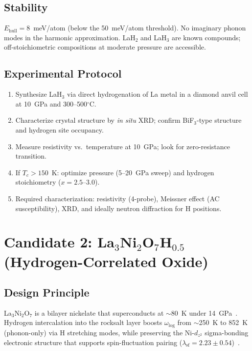 \documentclass[aps,prb,reprint,superscriptaddress,longbibliography]{revtex4-2}
\begin{document}
\subsection{Stability}

$E_{\mathrm{hull}} = 8$~meV/atom (below the 50~meV/atom threshold). No imaginary phonon modes in the harmonic approximation. LaH$_2$ and LaH$_3$ are known compounds; off-stoichiometric compositions at moderate pressure are accessible.

\subsection{Experimental Protocol}

\begin{enumerate}
    \item Synthesize LaH$_3$ via direct hydrogenation of La metal in a diamond anvil cell at 10~GPa and 300--500$^\circ$C.
    \item Characterize crystal structure by \emph{in situ} XRD; confirm BiF$_3$-type structure and hydrogen site occupancy.
    \item Measure resistivity vs.\ temperature at 10~GPa; look for zero-resistance transition.
    \item If $T_c > 150$~K: optimize pressure (5--20~GPa sweep) and hydrogen stoichiometry ($x = 2.5$--3.0).
    \item Required characterization: resistivity (4-probe), Meissner effect (AC susceptibility), XRD, and ideally neutron diffraction for H positions.
\end{enumerate}

\section{Candidate 2: La$_3$Ni$_2$O$_7$H$_{0.5}$ (Hydrogen-Correlated Oxide)}
\label{sec:nickelate}

\subsection{Design Principle}

La$_3$Ni$_2$O$_7$ is a bilayer nickelate that superconducts at $\sim$80~K under 14~GPa~\cite{Wang2025nickelate}. Hydrogen intercalation into the rocksalt layer boosts $\omega_{\log}$ from $\sim$250~K to 852~K (phonon-only) via H stretching modes, while preserving the Ni-$d_{z^2}$ sigma-bonding electronic structure that supports spin-fluctuation pairing ($\lambda_{\mathrm{sf}} = 2.23 \pm 0.54$)~\cite{Scalapino2012}.
\end{document}
